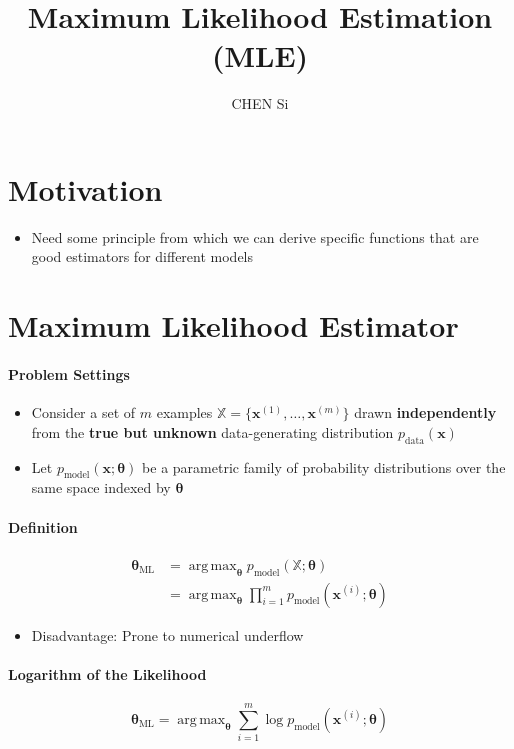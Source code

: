 \documentclass[12pt, a4paper]{article}
\title{Maximum Likelihood Estimation (MLE)}
\author{CHEN Si}
\date{}
\def\vx{\boldsymbol{x}}
\def\vtheta{\boldsymbol{\theta}}
\def\bbX{\mathbb{X}}
\DeclareMathOperator*{\argmax}{arg\,max}
\newcommand{\egvx}[1]{\boldsymbol{x}^{(#1)}}
\begin{document}
 


\maketitle
\tableofcontents


\section{Motivation}
\begin{itemize}
    \item Need some principle from which we can derive specific functions that are good estimators for different models
\end{itemize}


\section{Maximum Likelihood Estimator}
\paragraph{Problem Settings}
\begin{itemize}
    \item Consider a set of $m$ examples $\bbX = \{ \egvx{1}, \dots, \egvx{m} \}$ drawn \textbf{independently} from the \textbf{true but unknown} data-generating distribution $p_{\text{data}}(\vx)$
    \item Let $p_{\text{model}}(\vx ; \vtheta)$ be a parametric family of probability distributions over the same space indexed by $\vtheta$
\end{itemize}
\paragraph{Definition}
\[
    \begin{split}
        \vtheta_{\text{ML}} &= \argmax_{\vtheta} p_{\text{model}}(\bbX;\vtheta) \\ 
        &= \argmax_{\vtheta} \prod_{i=1}^m p_{\text{model}}(\egvx{i};\vtheta)
    \end{split}
\]
\begin{itemize}
    \item Disadvantage: Prone to numerical underflow
\end{itemize}
\paragraph{Logarithm of the Likelihood}
\[
    \vtheta_{\text{ML}} = \argmax_{\vtheta} \sum_{i=1}^m \log p_{\text{model}}(\egvx{i};\vtheta)
\]
\end{document}
